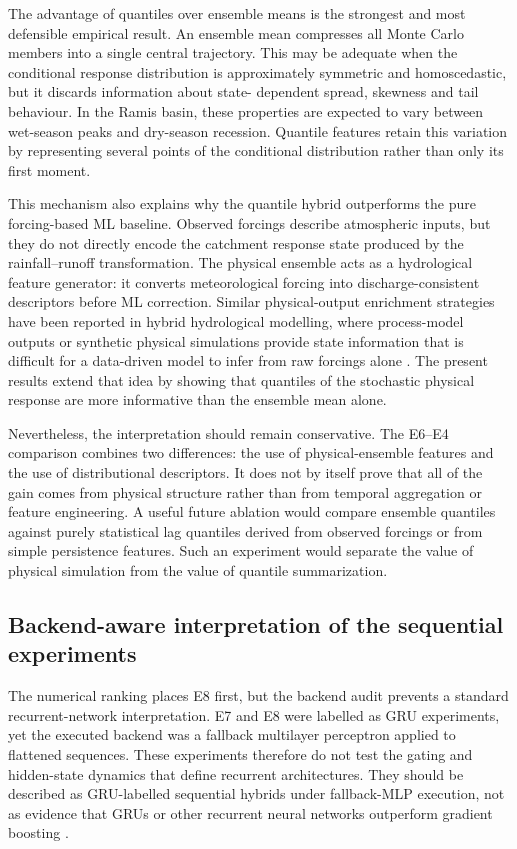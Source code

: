 The advantage of quantiles over ensemble means is the strongest and
most defensible empirical result. An ensemble mean compresses all
Monte Carlo members into a single central trajectory. This may be
adequate when the conditional response distribution is approximately
symmetric and homoscedastic, but it discards information about state-
dependent spread, skewness and tail behaviour. In the Ramis basin,
these properties are expected to vary between wet-season peaks and
dry-season recession. Quantile features retain this variation by
representing several points of the conditional distribution rather than
only its first moment.

This mechanism also explains why the quantile hybrid outperforms the
pure forcing-based ML baseline. Observed forcings describe atmospheric
inputs, but they do not directly encode the catchment response state
produced by the rainfall--runoff transformation. The physical ensemble
acts as a hydrological feature generator: it converts meteorological
forcing into discharge-consistent descriptors before ML correction.
Similar physical-output enrichment strategies have been reported in
hybrid hydrological modelling, where process-model outputs or synthetic
physical simulations provide state information that is difficult for a
data-driven model to infer from raw forcings alone
\citep{mekonnen2015hybrid,yang2020physical,xie2021physics,li2024process,zhu2025hybrid}. The present results extend that idea by showing that
quantiles of the stochastic physical response are more informative than
the ensemble mean alone.

Nevertheless, the interpretation should remain conservative. The
E6--E4 comparison combines two differences: the use of physical-ensemble
features and the use of distributional descriptors. It does not by
itself prove that all of the gain comes from physical structure rather
than from temporal aggregation or feature engineering. A useful future
ablation would compare ensemble quantiles against purely statistical lag
quantiles derived from observed forcings or from simple persistence
features. Such an experiment would separate the value of physical
simulation from the value of quantile summarization.

\subsection{Backend-aware interpretation of the sequential experiments}
\label{subsec:discussion-backend}

The numerical ranking places E8 first, but the backend audit prevents a
standard recurrent-network interpretation. E7 and E8 were labelled as
GRU experiments, yet the executed backend was a fallback multilayer
perceptron applied to flattened sequences. These experiments therefore
do not test the gating and hidden-state dynamics that define recurrent
architectures. They should be described as GRU-labelled sequential
hybrids under fallback-MLP execution, not as evidence that GRUs or other
recurrent neural networks outperform gradient boosting
\citep{kratzert2018rainfall,kratzert2019towards}.

